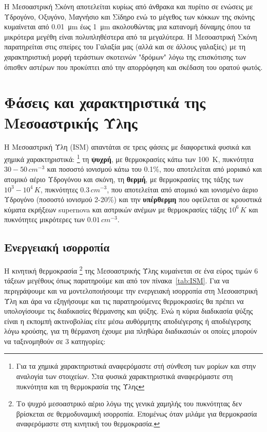 \documentclass[a4paper,12pt]{memoir}
\begin{document}
Η Μεσοαστρική Σκόνη αποτελείται κυρίως από άνθρακα και πυρίτιο σε ενώσεις με Υδρογόνο, Οξυγόνο, Μαγνήσιο και Σίδηρο ενώ το μέγεθος των κόκκων της σκόνης κυμαίνεται από \SI{0.01}{\micro\meter} έως \SI{1}{\micro\meter} ακολουθώντας μια κατανομή δύναμης όπου τα μικρότερα μεγέθη είναι πολυπληθέστερα από τα μεγαλύτερα. 
Η Μεσοαστρική Σκόνη παρατηρείται στις σπείρες του Γαλαξία μας (αλλά και σε άλλους γαλαξίες) με τη χαρακτηριστική μορφή τεράστιων σκοτεινών "δρόμων" λόγω της επισκότισης των όπισθεν αστέρων που προκύπτει από την απορρόφηση και σκέδαση του ορατού φωτός.

\section{Φάσεις και χαρακτηριστικά της Μεσοαστρικής Ύλης}
Η Μεσοαστρική Ύλη (ISM) απαντάται σε τρεις φάσεις με διαφορετικά φυσικά και χημικά χαρακτηριστικά: 
\footnote{Για τα χημικά χαρακτηριστικά αναφερόμαστε στή σύνθεση των μορίων και στην αναλογία των στοιχείων. Στα φυσικά χαρακτηριστικά αναφερόμαστε στη πυκνότητα και τη θερμοκρασία της Ύλης} 
τη \textbf{ψυχρή}, με θερμοκρασίες κάτω των \SI{100}{\kelvin}, πυκνότητα $30-50\, cm^{-3}$ και ποσοστό ιονισμού κάτω του 0.1\%, που αποτελείται από μοριακό και ατομικό αέριο Υδρογόνου και σκόνη, τη \textbf{θερμή}, με θερμοκρασίες της τάξης των $10^3-10^4\,K$, πυκνότητες $0.3\, cm^{-3}$, που αποτελείται από ατομικό και ιονισμένο άεριο Υδρογόνο (ποσοστό ιονισμού 2-20\%) και την \textbf{υπέρθερμη} που οφείλεται σε κρουστικά κύματα εκρήξεων supernova και αστρικών ανέμων με θερμοκρασίες τάξης $10^6 \,K$ και πυκνότητες μικρότερες των $0.01\, cm^{-3}$.


\subsection{Ενεργειακή ισορροπία}
\label{par:EnergyBalance}
Η κινητική θερμοκρασία \footnote{Το ψυχρό μεσοαστρικό αέριο λόγω της γενικά χαμηλής του πυκνότητας δεν βρίσκεται σε θερμοδυναμική ισορροπία. Επομένως όταν μιλάμε για θερμοκρασία αναφερόμαστε στη κινητική του θερμοκρασία.\cite[p. 28]{spitzer_1998}} της Μεσοαστρικής Ύλης κυμαίνεται σε ένα εύρος τιμών 6 τάξεων μεγέθους όπως παρατηρούμε και από τον πίνακα~\ref{tab:ISM}. Για να περιγράψουμε και να μοντελοποιήσουμε την ενεργειακή ισορροπία στη Μεσοαστρική Ύλη και άρα να εξηγήσουμε και τις παρατηρούμενες θερμοκρασίες θα πρέπει να υπολογίσουμε τις διαδικασίες θέρμανσης και ψύξης. 
Ενώ η κύρια διαδικασία ψύξης είναι η εκπομπή ακτινοβολίας είτε μέσω αυθόρμητης αποδιέγερσης ή αποδιέγερσης λόγω κρούσης, για τη θέρμανση έχουμε μια πληθώρα διαδικασιών οι οποίες μπορούν να ταξινομηθούν σε 3 κατηγορίες:
\end{document}
